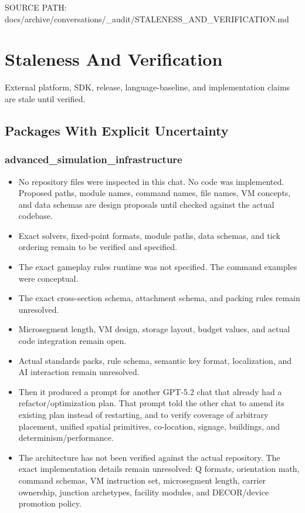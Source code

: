 \documentclass[11pt,a4paper]{report}
\begin{document}
{\small\raggedright SOURCE PATH: docs/\allowbreak{}archive/\allowbreak{}conversations/\allowbreak{}\_\allowbreak{}audit/\allowbreak{}STALENESS\_\allowbreak{}AND\_\allowbreak{}VERIFICATION.md\par}


\section{Staleness And Verification}

External platform, SDK, release, language-baseline, and implementation claims are stale until verified.


\subsection{Packages With Explicit Uncertainty}

\subsubsection{advanced\_simulation\_infrastructure}

\begin{itemize}
\item [UNCERTAIN / UNVERIFIED] No repository files were inspected in this chat. No code was implemented. Proposed paths, module names, command names, file names, VM concepts, and data schemas are design proposals until checked against the actual codebase.
\item [UNCERTAIN / UNVERIFIED] Exact solvers, fixed-point formats, module paths, data schemas, and tick ordering remain to be verified and specified.
\item [UNCERTAIN / UNVERIFIED] The exact gameplay rules runtime was not specified. The command examples were conceptual.
\item [UNCERTAIN / UNVERIFIED] The exact cross-section schema, attachment schema, and packing rules remain unresolved.
\item [UNCERTAIN / UNVERIFIED] Microsegment length, VM design, storage layout, budget values, and actual code integration remain open.
\item [UNCERTAIN / UNVERIFIED] Actual standards packs, rule schema, semantic key format, localization, and AI interaction remain unresolved.
\item Then it produced a prompt for another GPT-5.2 chat that already had a refactor/optimization plan. That prompt told the other chat to amend its existing plan instead of restarting, and to verify coverage of arbitrary placement, unified spatial primitives, co-location, signage, buildings, and determinism/performance.
\item [UNCERTAIN / UNVERIFIED] The architecture has not been verified against the actual repository. The exact implementation details remain unresolved: Q formats, orientation math, command schemas, VM instruction set, microsegment length, carrier ownership, junction archetypes, facility modules, and DECOR/device promotion policy.
\end{itemize}
\end{document}
